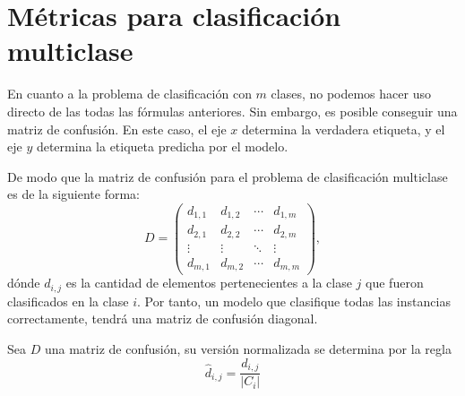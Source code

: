 \section{Métricas para clasificación multiclase}
En cuanto a la problema de clasificación con $m$ clases, no podemos hacer uso directo de las todas las fórmulas anteriores. Sin embargo, es posible conseguir una matriz de confusión. En este caso, el eje $x$ determina la verdadera etiqueta, y el eje $y$ determina la etiqueta predicha por el modelo.

De modo que la matriz de confusión para el problema de clasificación multiclase es de la siguiente forma:
\begin{equation}
    D = \left(\begin{matrix}
        d_{1,1} & d_{1,2} & \cdots & d_{1,m} \\
        d_{2,1} & d_{2,2} & \cdots & d_{2,m} \\
        \vdots & \vdots & \ddots & \vdots \\
        d_{m,1} & d_{m,2} & \cdots & d_{m,m} 
    \end{matrix}\right),
\end{equation}
dónde $d_{i,j}$ es la cantidad de elementos pertenecientes a la clase $j$ que fueron clasificados en la clase $i$. Por tanto, un modelo que clasifique todas las instancias correctamente, tendrá una matriz de confusión diagonal.  

\begin{definition}
    Sea $D$ una matriz de confusión, su versión normalizada se determina por la regla 
    \begin{equation}
        \hat d_{i,j} = \frac{d_{i,j}}{|C_i|}
    \end{equation}
\end{definition}

